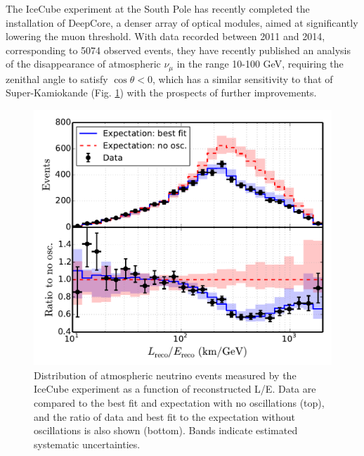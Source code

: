 The IceCube experiment at the South Pole has recently completed the installation of DeepCore, a denser array of optical modules, aimed at significantly lowering the muon threshold. With data recorded between 2011 and 2014, corresponding to 5074 observed events, they have recently published an analysis of the disappearance of atmospheric $\nu_\mu$  \cite{Aartsen2016161} in the range 10-100 GeV, requiring the zenithal angle to satisfy $\cos \theta < 0$,  which has a similar sensitivity to that of Super-Kamiokande (Fig. \ref{fig:icecubeosc}) with the prospects of further improvements. 


\begin{figure}[htbp]
\centering
\includegraphics[width=0.6\linewidth]{figures/icecube_osc2014_data_mc_LE.pdf}
  \caption{Distribution of atmospheric neutrino events measured by the IceCube experiment\cite{Aartsen2016161} as a function of
reconstructed L/E. Data are compared to the best fit and
expectation with no oscillations (top), and the ratio of data
and best fit to the expectation without oscillations is also shown
(bottom). Bands indicate estimated systematic uncertainties.}
 \label{fig:icecubeosc}
 \end{figure}